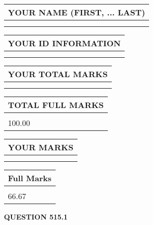 \documentclass{ctexart}
\begin{document}
   
   
   
\newpage 
\setcounter{page}{ 
   515001 } 
   
   
   
   
\noindent\begin{tabular}{|l|}
\hline
YOUR NAME (FIRST, ... LAST)  \\
\hline
 \\ 
 \\ 
\hline
\end{tabular}
\hspace{0.05in} \begin{tabular}{|l|}
\hline
 YOUR   ID   INFORMATION  \\
\hline
 \\ 
 \\ 
\hline
\end{tabular}
   
   
\vspace{0.2in}\noindent\begin{tabular}{|l|}
\hline
YOUR TOTAL MARKS  \\
\hline
 \\ 
 \\ 
\hline
\end{tabular}
\hspace{0.05in} \begin{tabular}{|l|}
\hline
TOTAL FULL MARKS  \\
\hline
 \\ 
100.00 \\
\hline
\end{tabular}
   
   
 \vspace{0.2in}
 
 
 
 
   
   
  
\vspace{0.2in}
  
\noindent\begin{tabular}{|l|}
\hline
 YOUR MARKS  \\
\hline
 \\ 
 \\ 
\hline
\end{tabular}
\hspace{0.05in} \begin{tabular}{|l|}
\hline
 Full Marks  \\
\hline
 \\ 
66.67 \\
\hline
\end{tabular}
{\textbf{\Large{QUESTION
515.1 
}}}
  
\end{document}
